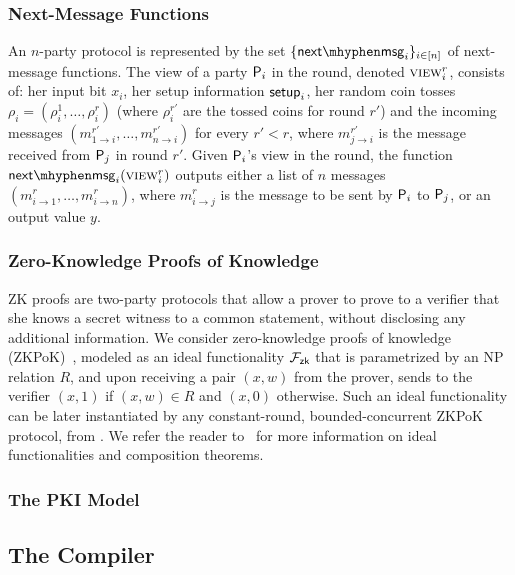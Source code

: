 \subsubsection{Next-Message Functions}
An $n$-party protocol is represented by the set $\sset{\nextmsg_i}_{i\in[n]}$ of next-message functions.
The view of a party $\mathsf{P}_i$ in the \rth round, denoted $\textsc{view}_i^r$, consists of: her input bit $x_i$, her setup information $\mathsf{setup}_i$, her random coin tosses $\rho_i=(\rho_i^1,\ldots,\rho_i^r)$ (where $\rho_i^{r'}$ are the tossed coins for round $r'$) and the incoming messages $(m^{r'}_{1\to i}, \ldots, m^{r'}_{n\to i})$ for every $r'<r$, where $m^{r'}_{j\to i}$ is the message received from $\mathsf{P}_j$ in round $r'$.
Given $\mathsf{P}_i$'s view in the \rth round, the function $\nextmsg_i(\view_i^r)$ outputs either a list of $n$ messages $(m^r_{i\to 1}, \ldots, m^r_{i\to n})$, where $m^r_{i\to j}$ is the message to be sent by $\mathsf{P}_i$ to $\mathsf{P}_j$, or an output value $y$.

\subsubsection{Zero-Knowledge Proofs of Knowledge}
ZK proofs are two-party protocols that allow a prover to prove to a verifier that she knows a secret witness to a common statement, without disclosing any additional information.
We consider zero-knowledge proofs of knowledge (ZKPoK)~\cite{GMR85}, modeled as an ideal functionality $\mathcal{F}_\mathsf{zk}$ that is parametrized by an NP relation $R$, and upon receiving a pair $(x,w)$ from the prover, sends to the verifier $(x,1)$ if $(x,w)\in R$ and $(x,0)$ otherwise. Such an ideal functionality can be later instantiated by any constant-round, bounded-concurrent ZKPoK protocol, \eg from \cite{Pass04}. We refer the reader to~\cite{Canetti01,Goldreich04} for more information on ideal functionalities and composition theorems.


\subsubsection{The PKI Model}

\subsection{The Compiler}\label{sec:ltf:compiler}


